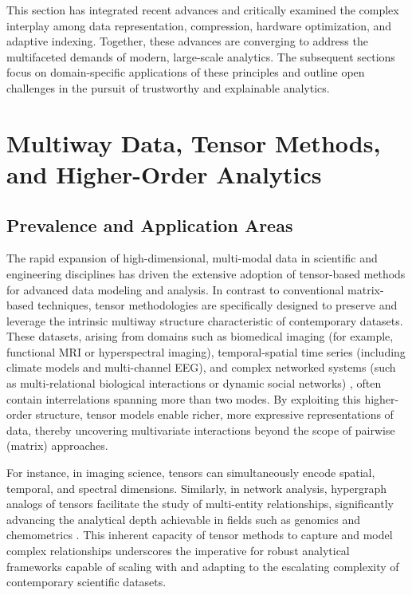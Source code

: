 \bigskip

This section has integrated recent advances and critically examined the complex interplay among data representation, compression, hardware optimization, and adaptive indexing. Together, these advances are converging to address the multifaceted demands of modern, large-scale analytics. The subsequent sections focus on domain-specific applications of these principles and outline open challenges in the pursuit of trustworthy and explainable analytics.

\section{Multiway Data, Tensor Methods, and Higher-Order Analytics}

\subsection{Prevalence and Application Areas}

The rapid expansion of high-dimensional, multi-modal data in scientific and engineering disciplines has driven the extensive adoption of tensor-based methods for advanced data modeling and analysis. In contrast to conventional matrix-based techniques, tensor methodologies are specifically designed to preserve and leverage the intrinsic multiway structure characteristic of contemporary datasets. These datasets, arising from domains such as biomedical imaging (for example, functional MRI or hyperspectral imaging), temporal-spatial time series (including climate models and multi-channel EEG), and complex networked systems (such as multi-relational biological interactions or dynamic social networks) \cite{ref104}, often contain interrelations spanning more than two modes. By exploiting this higher-order structure, tensor models enable richer, more expressive representations of data, thereby uncovering multivariate interactions beyond the scope of pairwise (matrix) approaches.

For instance, in imaging science, tensors can simultaneously encode spatial, temporal, and spectral dimensions. Similarly, in network analysis, hypergraph analogs of tensors facilitate the study of multi-entity relationships, significantly advancing the analytical depth achievable in fields such as genomics and chemometrics \cite{ref104}. This inherent capacity of tensor methods to capture and model complex relationships underscores the imperative for robust analytical frameworks capable of scaling with and adapting to the escalating complexity of contemporary scientific datasets.


